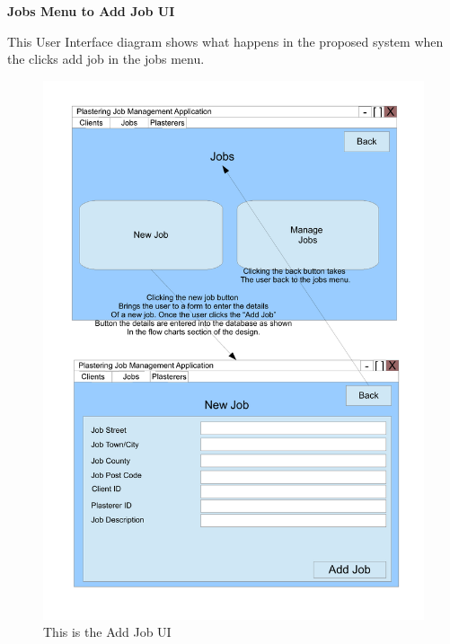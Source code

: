 \pagebreak
\textbf{Jobs Menu to Add Job UI}
\begin{flushleft}
This User Interface diagram shows what happens in the proposed system when the clicks add job in the jobs menu.
\end{flushleft}
\begin{figure}[H]
\includegraphics[scale=0.5]{./Design/images/NewJob.pdf}
    \caption{This is the Add Job UI} 
\label{fig:FlowChartAddJob}
\end{figure}


